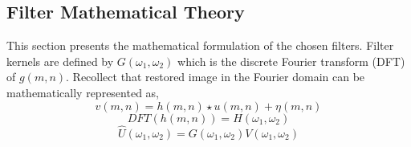 \graphicspath{{mehul_pics/}}%
\subsection{Filter Mathematical Theory} %
This section presents the mathematical formulation of the chosen filters. Filter kernels are defined by $G(\omega_1,\omega_2)$ which is the discrete Fourier transform (DFT) of $g(m,n)$. Recollect that restored image in the Fourier domain can be mathematically represented as,
\begin{equation}
v(m,n)= h(m,n) \star u(m,n) + \eta(m,n)
\end{equation}
\begin{equation}
DFT(h(m,n)) = H(\omega_1,\omega_2)
\end{equation}
\begin{equation}
\hat{U}(\omega_1,\omega_2)= G(\omega_1,\omega_2)V(\omega_1,\omega_2)
\end{equation}

